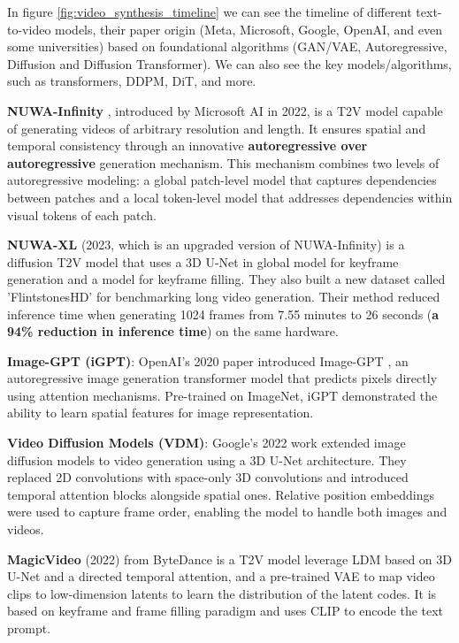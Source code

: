 In figure \ref{fig:video_synthesis_timeline} we can see the timeline of different text-to-video models, their paper origin (Meta, Microsoft, Google, OpenAI, and even some universities) based on foundational algorithms (GAN/VAE, Autoregressive, Diffusion and Diffusion Transformer). We can also see the key models/algorithms, such as transformers, DDPM, DiT, and more.

\textbf{NUWA-Infinity } \cite{nuwa_infinity}, introduced by Microsoft AI in 2022, is a T2V model capable of generating videos of arbitrary resolution and length. It ensures spatial and temporal consistency through an innovative \textbf{autoregressive over autoregressive} generation mechanism. This mechanism combines two levels of autoregressive modeling: a global patch-level model that captures dependencies between patches and a local token-level model that addresses dependencies within visual tokens of each patch.

\textbf{NUWA-XL} \cite{nuwa_xl} (2023, which is an upgraded version of NUWA-Infinity) is a diffusion T2V model that uses a 3D U-Net in global model for keyframe generation and a model for keyframe filling. They also built a new dataset called 'FlintstonesHD' for benchmarking long video generation. Their method reduced inference time when generating 1024 frames from 7.55 minutes to 26 seconds (\textbf{a 94\% reduction in inference time}) on the same hardware.

\textbf{Image-GPT (iGPT)}: OpenAI's 2020 paper introduced Image-GPT \cite{imagegpt}, an autoregressive image generation transformer model that predicts pixels directly using attention mechanisms. Pre-trained on ImageNet, iGPT demonstrated the ability to learn spatial features for image representation.

\textbf{Video Diffusion Models (VDM)}: Google's 2022 work \cite{video_diffusion_models} extended image diffusion models to video generation using a 3D U-Net architecture. They replaced 2D convolutions with space-only 3D convolutions and introduced temporal attention blocks alongside spatial ones. Relative position embeddings were used to capture frame order, enabling the model to handle both images and videos.

\textbf{MagicVideo} (2022) \cite{magic_video} from ByteDance is a T2V model leverage LDM based on 3D U-Net and a directed temporal attention, and a pre-trained VAE to map video clips to low-dimension latents to learn the distribution of the latent codes. It is based on keyframe and frame filling paradigm and uses CLIP to encode the text prompt.

